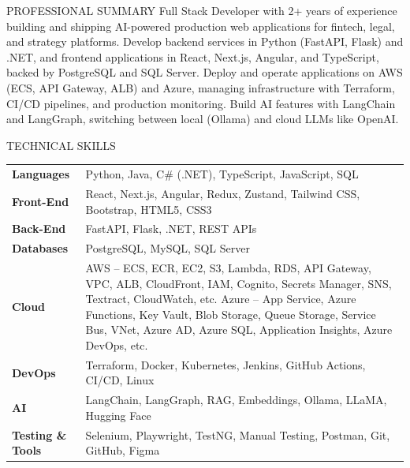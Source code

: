 \documentclass{resume} %
\begin{document}

\begin{rSection}{PROFESSIONAL SUMMARY}
Full Stack Developer with 2+ years of experience building and shipping AI-powered production web applications for fintech, legal, and strategy platforms. Develop backend services in Python (FastAPI, Flask) and .NET, and frontend applications in React, Next.js, Angular, and TypeScript, backed by PostgreSQL and SQL Server. Deploy and operate applications on AWS (ECS, API Gateway, ALB) and Azure, managing infrastructure with Terraform, CI/CD pipelines, and production monitoring. Build AI features with LangChain and LangGraph, switching between local (Ollama) and cloud LLMs like OpenAI.
\end{rSection}


\begin{rSection}{TECHNICAL SKILLS}
\begin{tabular}{ @{} >{\bfseries}l @{\hspace{6ex}} p{} }
Languages & Python, Java, C\# (.NET), TypeScript, JavaScript, SQL \\
Front-End & React, Next.js, Angular, Redux, Zustand, Tailwind CSS, Bootstrap, HTML5, CSS3 \\
Back-End & FastAPI, Flask, .NET, REST APIs \\
Databases & PostgreSQL, MySQL, SQL Server \\
Cloud & AWS -- ECS, ECR, EC2, S3, Lambda, RDS, API Gateway, VPC, ALB, CloudFront, IAM, Cognito, Secrets Manager, SNS, Textract, CloudWatch, etc. \newline Azure -- App Service, Azure Functions, Key Vault, Blob Storage, Queue Storage, Service Bus, VNet, Azure AD, Azure SQL, Application Insights, Azure DevOps, etc. \\
DevOps & Terraform, Docker, Kubernetes, Jenkins, GitHub Actions, CI/CD, Linux \\
AI & LangChain, LangGraph, RAG, Embeddings, Ollama, LLaMA, Hugging Face \\
Testing \& Tools & Selenium, Playwright, TestNG, Manual Testing, Postman, Git, GitHub, Figma \\
\end{tabular}
\end{rSection}
\end{document}
